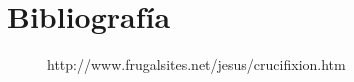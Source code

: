 \section{Bibliografía}
\begin{description}



\item[] http://www.frugalsites.net/jesus/crucifixion.htm


\end{description}

